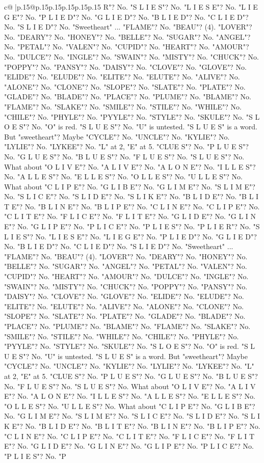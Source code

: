 \documentclass{article}
\begin{document}
{\begin{supertabular}{c@{$\;$}|p{.15\linewidth}@{}p{.15\linewidth}p{.15\linewidth}p{.15\linewidth}p{.15\linewidth}p{.15\linewidth}}
{{{R"? No. "S L I E S"? No. "L I E S E"? No. "L I E G E"? No. "P L I E D"? No. "G L I E D"? No. "B L I E D"? No. "C L I E D"? No. "S L I E D"? No. "Sweetheart" ... "FLAME"? No. "BEAU"? (4). "LOVER"? No. "DEARY"? No. "HONEY"? No. "BELLE"? No. "SUGAR"? No. "ANGEL"? No. "PETAL"? No. "VALEN"? No. "CUPID"? No. "HEART"? No. "AMOUR"? No. "DULCE"? No. "INGLE"? No. "SWAIN"? No. "MISTY"? No. "CHUCK"? No. "POPPY"? No. "PANSY"? No. "DAISY"? No. "CLOVE"? No. "GLOVE"? No. "ELIDE"? No. "ELUDE"? No. "ELITE"? No. "ELUTE"? No. "ALIVE"? No. "ALONE"? No. "CLONE"? No. "SLOPE"? No. "SLATE"? No. "PLATE"? No. "GLADE"? No. "BLADE"? No. "PLACE"? No. "PLUME"? No. "BLAME"? No. "FLAME"? No. "SLAKE"? No. "SMILE"? No. "STILE"? No. "WHILE"? No. "CHILE"? No. "PHYLE"? No. "PYYLE"? No. "STYLE"? No. "SKULE"? No. "S L O E S"? No. "O" is red. "S L U E S"? No. "U" is untested. "S L U E S" is a word. But "sweetheart"? Maybe "CYCLE"? No. "UNCLE"? No. "KYLIE"? No. "LYLIE"? No. "LYKEE"? No. "L" at 2, "E" at 5. "CLUE S"? No. "P L U E S"? No. "G L U E S"? No. "B L U E S"? No. "F L U E S"? No. "S L U E S"? No. What about "O L I V E"? No. "A L I V E"? No. "A L O N E"? No. "I L L E S"? No. "A L L E S"? No. "E L L E S"? No. "O L L E S"? No. "U L L E S"? No. What about "C L I P E"? No. "G L I B E"? No. "G L I M E"? No. "S L I M E"? No. "S L I C E"? No. "S L I D E"? No. "S L I K E"? No. "B L I D E"? No. "B L I T E"? No. "B L I N E"? No. "B L I P E"? No. "C L I N E"? No. "C L I P E"? No. "C L I T E"? No. "F L I C E"? No. "F L I T E"? No. "G L I D E"? No. "G L I N E"? No. "G L I P E"? No. "P L I C E"? No. "P L I E S"? No. "P L I E R"? No. "S L I E S"? No. "L I E S E"? No. "L I E G E"? No. "P L I E D"? No. "G L I E D"? No. "B L I E D"? No. "C L I E D"? No. "S L I E D"? No. "Sweetheart" ... "FLAME"? No. "BEAU"? (4). "LOVER"? No. "DEARY"? No. "HONEY"? No. "BELLE"? No. "SUGAR"? No. "ANGEL"? No. "PETAL"? No. "VALEN"? No. "CUPID"? No. "HEART"? No. "AMOUR"? No. "DULCE"? No. "INGLE"? No. "SWAIN"? No. "MISTY"? No. "CHUCK"? No. "POPPY"? No. "PANSY"? No. "DAISY"? No. "CLOVE"? No. "GLOVE"? No. "ELIDE"? No. "ELUDE"? No. "ELITE"? No. "ELUTE"? No. "ALIVE"? No. "ALONE"? No. "CLONE"? No. "SLOPE"? No. "SLATE"? No. "PLATE"? No. "GLADE"? No. "BLADE"? No. "PLACE"? No. "PLUME"? No. "BLAME"? No. "FLAME"? No. "SLAKE"? No. "SMILE"? No. "STILE"? No. "WHILE"? No. "CHILE"? No. "PHYLE"? No. "PYYLE"? No. "STYLE"? No. "SKULE"? No. "S L O E S"? No. "O" is red. "S L U E S"? No. "U" is untested. "S L U E S" is a word. But "sweetheart"? Maybe "CYCLE"? No. "UNCLE"? No. "KYLIE"? No. "LYLIE"? No. "LYKEE"? No. "L" at 2, "E" at 5. "CLUE S"? No. "P L U E S"? No. "G L U E S"? No. "B L U E S"? No. "F L U E S"? No. "S L U E S"? No. What about "O L I V E"? No. "A L I V E"? No. "A L O N E"? No. "I L L E S"? No. "A L L E S"? No. "E L L E S"? No. "O L L E S"? No. "U L L E S"? No. What about "C L I P E"? No. "G L I B E"? No. "G L I M E"? No. "S L I M E"? No. "S L I C E"? No. "S L I D E"? No. "S L I K E"? No. "B L I D E"? No. "B L I T E"? No. "B L I N E"? No. "B L I P E"? No. "C L I N E"? No. "C L I P E"? No. "C L I T E"? No. "F L I C E"? No. "F L I T E"? No. "G L I D E"? No. "G L I N E"? No. "G L I P E"? No. "P L I C E"? No. "P L I E S"? No. "P }}}
\end{supertabular}}
\end{document}
